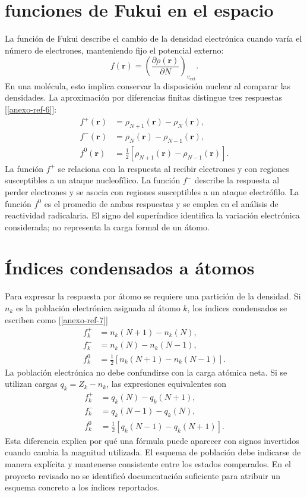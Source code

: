 \documentclass[12 pt, letter, oneside]{book}
\begin{document}
\section{funciones de Fukui en el espacio}
La función de Fukui describe el cambio de la densidad electrónica cuando varía el número de electrones, manteniendo fijo el potencial externo:
\begin{equation}
 f(\mathbf r)=\left(\frac{\partial\rho(\mathbf r)}{\partial N}\right)_{v_{\mathrm{ext}}}.
\end{equation}
En una molécula, esto implica conservar la disposición nuclear al comparar las densidades. La aproximación por diferencias finitas distingue tres respuestas [\ref{anexo-ref-6}]:
\begin{align}
 f^+(\mathbf r)&=\rho_{N+1}(\mathbf r)-\rho_N(\mathbf r),\\
 f^-(\mathbf r)&=\rho_N(\mathbf r)-\rho_{N-1}(\mathbf r),\\
 f^0(\mathbf r)&=\tfrac12\left[\rho_{N+1}(\mathbf r)-\rho_{N-1}(\mathbf r)\right].
\end{align}
La función $f^+$ se relaciona con la respuesta al recibir electrones y con regiones susceptibles a un ataque nucleofílico. La función $f^-$ describe la respuesta al perder electrones y se asocia con regiones susceptibles a un ataque electrófilo. La función $f^0$ es el promedio de ambas respuestas y se emplea en el análisis de reactividad radicalaria. El signo del superíndice identifica la variación electrónica considerada; no representa la carga formal de un átomo.

\section{Índices condensados a átomos}
Para expresar la respuesta por átomo se requiere una partición de la densidad. Si $n_k$ es la población electrónica asignada al átomo $k$, los índices condensados se escriben como [\ref{anexo-ref-7}]
\begin{align}
 f_k^+&=n_k(N+1)-n_k(N),\\
 f_k^-&=n_k(N)-n_k(N-1),\\
 f_k^0&=\tfrac12[n_k(N+1)-n_k(N-1)].
\end{align}
La población electrónica no debe confundirse con la carga atómica neta. Si se utilizan cargas $q_k=Z_k-n_k$, las expresiones equivalentes son
\begin{align}
 f_k^+&=q_k(N)-q_k(N+1),\\
 f_k^-&=q_k(N-1)-q_k(N),\\
 f_k^0&=\tfrac12[q_k(N-1)-q_k(N+1)].
\end{align}
Esta diferencia explica por qué una fórmula puede aparecer con signos invertidos cuando cambia la magnitud utilizada. El esquema de población debe indicarse de manera explícita y mantenerse consistente entre los estados comparados. En el proyecto revisado no se identificó documentación suficiente para atribuir un esquema concreto a los índices reportados.
\end{document}

